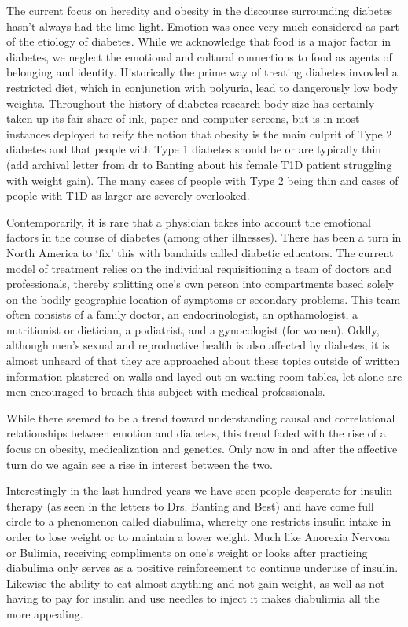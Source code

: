 \documentclass[12pt]{article}
\begin{document}
The current focus on heredity and obesity in the discourse surrounding diabetes hasn't always had the lime light. Emotion was once very much considered as part of the etiology of diabetes. While we acknowledge that food is a major factor in diabetes, we neglect the emotional and cultural connections to food as agents of belonging and identity. Historically the prime way of treating diabetes invovled a restricted diet, which in conjunction with polyuria, lead to dangerously low body weights. Throughout the history of diabetes research body size has certainly taken up its fair share of ink, paper and computer screens, but is in most instances deployed to reify the notion that obesity is the main culprit of Type 2 diabetes and that people with Type 1 diabetes should be or are typically thin (add archival letter from dr to Banting about his female T1D patient struggling with weight gain). The many cases of people with Type 2 being thin and cases of people with T1D as larger are severely overlooked. 

Contemporarily, it is rare that a physician takes into account the emotional factors in the course of diabetes (among other illnesses). There has been a turn in North America to `fix' this with bandaids called diabetic educators. The current model of treatment relies on the individual requisitioning a team of doctors and professionals, thereby splitting one's own person into compartments based solely on the bodily geographic location of symptoms or secondary problems. This team often consists of a family doctor, an endocrinologist, an opthamologist, a nutritionist or dietician, a podiatrist, and a gynocologist (for women). Oddly, although men's sexual and reproductive health is also affected by diabetes, it is almost unheard of that they are approached about these topics outside of written information plastered on walls and layed out on waiting room tables, let alone are men encouraged to broach this subject with medical professionals. 

While there seemed to be a trend toward understanding causal and correlational relationships between emotion and diabetes, this trend faded with the rise of a focus on obesity, medicalization and genetics. Only now in and after the affective turn do we again see a rise in interest between the two. 

Interestingly in the last hundred years we have seen people desperate for insulin therapy (as seen in the letters to Drs. Banting and Best) and have come full circle to a phenomenon called diabulima, whereby one restricts insulin intake in order to lose weight or to maintain a lower weight. Much like Anorexia Nervosa or Bulimia, receiving compliments on one's weight or looks after practicing diabulima only serves as a positive reinforcement to continue underuse of insulin. Likewise the ability to eat almost anything and not gain weight, as well as not having to pay for insulin and use needles to inject it makes diabulimia all the more appealing. 
\end{document}

